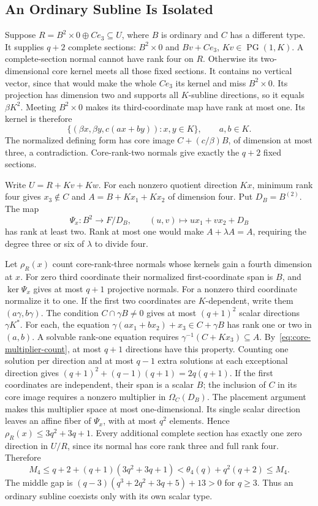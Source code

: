 \documentclass[12pt,letterpaper,onecolumn]{article}
\theoremstyle{definition}
\theoremstyle{remark}
\DeclareMathOperator{\PG}{PG}
\begin{document}
\subsection{An Ordinary Subline Is Isolated}
Suppose \(R=B^2\times0\oplus Ce_3\subseteq U\), where \(B\) is ordinary and \(C\) has a different type.
It supplies \(q+2\) complete sections: \(B^2\times0\) and \(Bv+Ce_3\), \(Kv\in\PG(1,K)\).
A complete-section normal cannot have rank four on \(R\).
Otherwise its two-dimensional core kernel meets all those fixed sections. It contains no vertical vector, since that would make the whole \(Ce_3\) its kernel and miss \(B^2\times0\).
Its projection has dimension two and supports all \(K\)-subline directions, so it equals \(\beta K^2\).
Meeting \(B^2\times0\) makes its third-coordinate map have rank at most one. Its kernel is therefore
\[
\{(\beta x,\beta y,c(ax+by)):x,y\in K\},\qquad a,b\in K.
\]
The normalized defining form has core image \(C+(c/\beta)B\), of dimension at most three, a contradiction.
Core-rank-two normals give exactly the \(q+2\) fixed sections.

Write \(U=R+Kv+Kw\).
For each nonzero quotient direction \(Kx\), minimum rank four gives
\(x_3\notin C\) and \(A=B+Kx_1+Kx_2\) of dimension four.
Put \(D_B=B^{(2)}\). The map
\[
\Psi_x:B^2\to F/D_B,\qquad (u,v)\mapsto ux_1+vx_2+D_B
\]
has rank at least two. Rank at most one would make \(A+\lambda A=A\), requiring the degree three or six of \(\lambda\) to divide four.

Let \(\rho_R(x)\) count core-rank-three normals whose kernels gain a fourth dimension at \(x\).
For zero third coordinate their normalized first-coordinate span is \(B\), and \(\ker\Psi_x\) gives at most \(q+1\) projective normals.
For a nonzero third coordinate normalize it to one.
If the first two coordinates are \(K\)-dependent, write them \((a\gamma,b\gamma)\).
The condition \(C\cap\gamma B\ne0\) gives at most \((q+1)^2\) scalar directions \(\gamma K^*\).
For each, the equation
\(\gamma(ax_1+bx_2)+x_3\in C+\gamma B\)
has rank one or two in \((a,b)\).
A solvable rank-one equation requires \(\gamma^{-1}(C+Kx_3)\subseteq A\).
By~\eqref{eq:core-multiplier-count}, at most \(q+1\) directions have this property.
Counting one solution per direction and at most \(q-1\) extra solutions at each exceptional direction gives
\((q+1)^2+(q-1)(q+1)=2q(q+1)\).
If the first coordinates are independent, their span is a scalar \(B\); the inclusion of \(C\) in its core image requires a nonzero multiplier in \(\Omega_C(D_B)\).
The placement argument makes this multiplier space at most one-dimensional.
Its single scalar direction leaves an affine fiber of \(\Psi_x\), with at most \(q^2\) elements.
Hence \(\rho_R(x)\le3q^2+3q+1\).
Every additional complete section has exactly one zero direction in \(U/R\), since its normal has core rank three and full rank four. Therefore
\[
M_4\le q+2+(q+1)(3q^2+3q+1)
<\theta_4(q)+q^2(q+2)\le M_4.
\]
The middle gap is
\((q-3)(q^3+2q^2+3q+5)+13>0\) for \(q\ge3\).
Thus an ordinary subline coexists only with its own scalar type.
\end{document}

